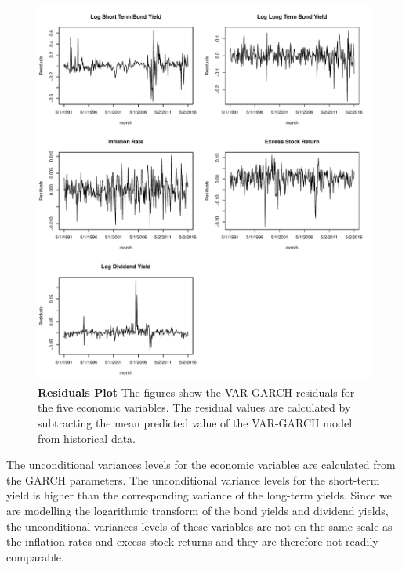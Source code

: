 \documentclass{sfuthesis}
\numberwithin{equation}{chapter}
\begin{document}
		\begin{figure}[h]
			\includegraphics[width=1\linewidth]{HistRest.pdf} 
			\caption[Residuals Plot]{\textbf{Residuals Plot}
				\vspace{-0.4cm}
				\newline\footnotesize \justify The figures show the VAR-GARCH residuals for the five economic variables. The residual values are calculated by subtracting the mean predicted value of the VAR-GARCH model from historical data.}
			\label{fig:Residuals Plot}
		\end{figure}
		
	
		\justify
		The unconditional variances levels for the economic variables are calculated from the GARCH parameters. The unconditional variance levels for the short-term yield is higher than the corresponding variance of the long-term yields. Since we are modelling the logarithmic transform of the bond yields and dividend yields, the unconditional variances levels of these variables are not on the same scale as the inflation rates and excess stock returns and they are therefore not readily comparable. 
	
\end{document}
